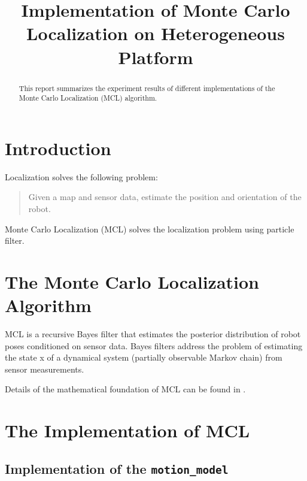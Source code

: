 



\title{Implementation of Monte Carlo Localization on Heterogeneous Platform}

\author{}

\maketitle

\begin{abstract}
  This report summarizes the experiment results of different implementations of
  the Monte Carlo Localization (MCL) algorithm.
\end{abstract}

\section{Introduction}

Localization solves the following problem:

\begin{quote}
  Given a map and sensor data, estimate the position and orientation of the robot.
\end{quote}

Monte Carlo Localization (MCL) solves the localization problem using particle
filter.

\section{The Monte Carlo Localization Algorithm}
MCL is a recursive Bayes filter that estimates the posterior distribution of robot
poses conditioned on sensor data.
Bayes filters address the problem of estimating the state x of a dynamical system
(partially observable Markov chain) from sensor measurements.

Details of the mathematical foundation of MCL can be found in \cite{THRUN200199}.

\section{The Implementation of MCL}

\subsection{Implementation of the \texttt{motion\_model}}
